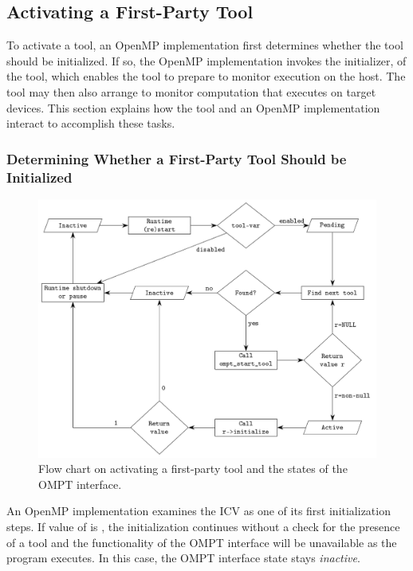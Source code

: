 \subsection{Activating a First-Party Tool}
\label{sec:ompt-initialization}

To activate a tool, an OpenMP implementation first determines whether 
the tool should be initialized. If so, the OpenMP implementation invokes 
the initializer, of the tool, which enables the tool to prepare to monitor 
execution on the host. The tool may then also arrange to monitor computation 
that executes on target devices. This section explains how the tool and an
OpenMP implementation interact to accomplish these tasks.




\subsubsection{Determining Whether a First-Party Tool Should be Initialized}
\label{sec:ompt-check-tool}

\begin{figure}[h]
  \centering
  \includegraphics[width=.9\linewidth]{tool_support/ompt_flow_chart.pdf}
  \caption{Flow chart on activating a first-party tool and the states
  of the OMPT interface.}
  \label{fig:ompt_diagram}
\end{figure}

An OpenMP implementation examines the  ICV as one of its first 
initialization steps. If value of  is , the 
initialization continues without a check for the presence of a tool and the 
functionality of the OMPT interface will be unavailable as the program executes.
In this case, the OMPT interface state stays \emph{inactive}.

